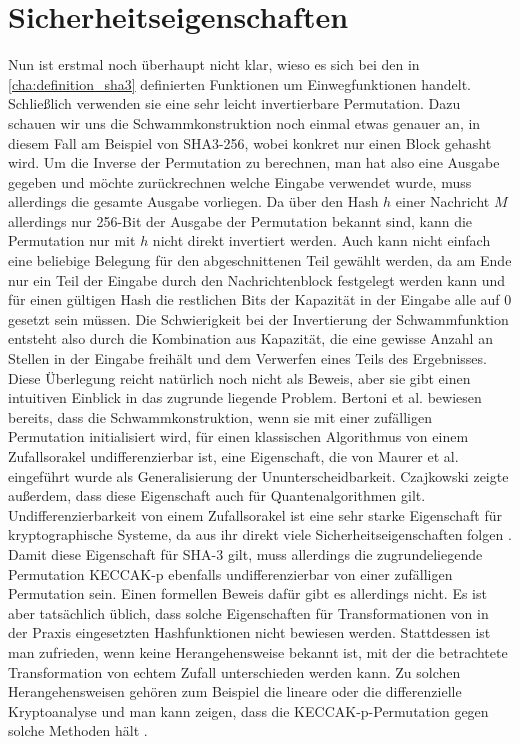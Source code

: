 \section{Sicherheitseigenschaften}
\label{cha:sha3_sicherheit}
Nun ist erstmal noch überhaupt nicht klar, wieso es sich bei den in \ref{cha:definition_sha3} definierten Funktionen um Einwegfunktionen handelt.
Schließlich verwenden sie eine sehr leicht invertierbare Permutation. Dazu schauen wir uns die Schwammkonstruktion noch einmal etwas genauer an,
in diesem Fall am Beispiel von SHA3-256, wobei konkret nur einen Block gehasht wird. Um die Inverse der Permutation zu berechnen, man hat also eine Ausgabe gegeben
und möchte zurückrechnen welche Eingabe verwendet wurde, muss allerdings die gesamte Ausgabe vorliegen. Da über den Hash $h$ einer Nachricht $M$ allerdings
nur 256-Bit der Ausgabe der Permutation bekannt sind, kann die Permutation nur mit $h$ nicht direkt invertiert werden. Auch kann nicht einfach eine beliebige Belegung
für den abgeschnittenen Teil gewählt werden, da am Ende nur ein Teil der Eingabe durch den Nachrichtenblock festgelegt werden kann und für einen gültigen Hash
die restlichen Bits der Kapazität in der Eingabe alle auf 0 gesetzt sein müssen. Die Schwierigkeit bei der Invertierung der Schwammfunktion entsteht also durch
die Kombination aus Kapazität, die eine gewisse Anzahl an Stellen in der Eingabe freihält und dem Verwerfen eines Teils des Ergebnisses.
Diese Überlegung reicht natürlich noch nicht als Beweis, aber sie gibt einen intuitiven Einblick in das zugrunde liegende Problem.
Bertoni et al. \cite{indifferentiability} bewiesen bereits, dass die Schwammkonstruktion, wenn sie mit einer zufälligen Permutation initialisiert wird,
für einen klassischen Algorithmus von einem Zufallsorakel undifferenzierbar ist, eine Eigenschaft, die von Maurer et al. \cite{MaReHo04} eingeführt wurde als Generalisierung
der Ununterscheidbarkeit. Czajkowski \cite{quantum_indifferentiability} zeigte außerdem, dass diese Eigenschaft auch für Quantenalgorithmen gilt. Undifferenzierbarkeit von einem Zufallsorakel
ist eine sehr starke Eigenschaft für kryptographische Systeme, da aus ihr direkt viele Sicherheitseigenschaften folgen \cite{indifferentiability}.
Damit diese Eigenschaft für SHA-3 gilt, muss allerdings die zugrundeliegende Permutation KECCAK-p ebenfalls undifferenzierbar von einer zufälligen Permutation sein.
Einen formellen Beweis dafür gibt es allerdings nicht. Es ist aber tatsächlich üblich, dass solche Eigenschaften für Transformationen von in der Praxis eingesetzten Hashfunktionen
nicht bewiesen werden. Stattdessen ist man zufrieden, wenn keine Herangehensweise bekannt ist, mit der die betrachtete Transformation von echtem Zufall unterschieden werden kann.
Zu solchen Herangehensweisen gehören zum Beispiel die lineare oder die differenzielle Kryptoanalyse und man kann zeigen, dass die KECCAK-p-Permutation gegen solche Methoden
hält \cite{Keccak11}.
